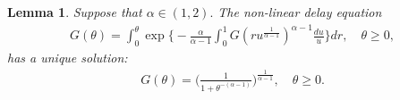 \documentclass[12pt,a4paper]{amsart}
\newtheorem{lem}[thm]{Lemma}
\theoremstyle{definition}
\numberwithin{equation}{section}
\begin{document}
\begin{lem} \label{lem: characterize the general Mittag-Leffler distribution}
  Suppose that $\alpha \in (1,2).$
  The non-linear delay equation
  \begin{align} \label{eq: equation for the distribution}
    G( \theta)
    = \int_0^\theta \exp\Big\{ - \frac{\alpha} {\alpha - 1} \int_0^1 G(ru^{\frac{1}{\alpha - 1} })^{\alpha - 1}\frac{du}{u} \Big\} dr,
    \quad \theta \geq 0,
  \end{align}
	has a unique solution:
  \begin{align}\label{eq: solution for the equation}
    G(\theta)
    = \Big(\frac{1}{1+\theta^{-(\alpha - 1)}}\Big)^{\frac{1}{\alpha - 1}},
    \quad \theta \geq 0.
  \end{align}
\end{lem}
\end{document}
